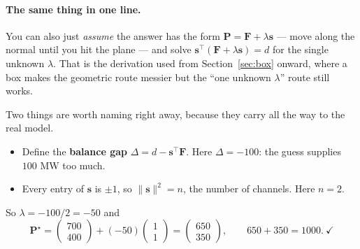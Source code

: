 \documentclass[11pt]{article}
\newcommand{\s}{\mathbf{s}}
\newcommand{\F}{\mathbf{F}}
\newcommand{\Pv}{\mathbf{P}}
\begin{document}
\paragraph{The same thing in one line.} You can also just \emph{assume} the
answer has the form $\Pv = \F + \lambda\s$ --- move along the normal until you
hit the plane --- and solve $\s^{\!\top}(\F + \lambda\s) = d$ for the single
unknown $\lambda$. That is the derivation used from Section~\ref{sec:box}
onward, where a box makes the geometric route messier but the ``one unknown
$\lambda$'' route still works.

Two things are worth naming right away, because they carry all the way to the
real model.

\begin{itemize}
\item Define the \textbf{balance gap} $\Delta = d - \s^{\!\top}\F$. Here
      $\Delta = -100$: the guess supplies $100$ MW too much.
\item Every entry of $\s$ is $\pm 1$, so $\lVert\s\rVert^2 = n$, the number of
      channels. Here $n=2$.
\end{itemize}

So $\lambda = -100/2 = -50$ and
\[
  \Pv^\star = \begin{pmatrix}700\\400\end{pmatrix}
            + (-50)\begin{pmatrix}1\\1\end{pmatrix}
            = \begin{pmatrix}650\\350\end{pmatrix},
  \qquad 650 + 350 = 1000 .\ \checkmark
\]

\begin{center}
\end{center}
\end{document}
